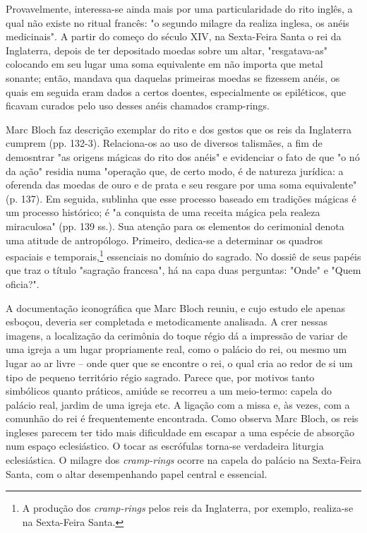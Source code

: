 \documentclass[a5paper]{book}
\begin{document}
Provavelmente, interessa-se ainda mais por uma particularidade do rito inglês, a qual não existe no ritual francês: "o segundo milagre da realiza inglesa, os anéis medicinais". A partir do começo do século XIV, na Sexta-Feira Santa o rei da Inglaterra, depois de ter depositado moedas sobre um altar, "resgatava-as" colocando em seu lugar uma soma equivalente em não importa que metal sonante; então, mandava qua daquelas primeiras moedas se fizessem anéis, os quais em seguida eram dados a certos doentes, especialmente os epiléticos, que ficavam curados pelo uso desses anéis chamados cramp-rings.

Marc Bloch faz descrição exemplar do rito e dos gestos que os reis da Inglaterra cumprem (pp. 132-3). Relaciona-os ao uso de diversos talismães, a fim de demosntrar "as origens mágicas do rito dos anéis" e evidenciar o fato de que "o nó da ação" residia numa "operação que, de certo modo, é de natureza jurídica: a oferenda das moedas de ouro e de prata e seu resgare por uma soma equivalente" (p. 137). Em seguida, sublinha que esse processo baseado em tradições mágicas é um processo histórico; é "a conquista de uma receita mágica pela realeza miraculosa" (pp. 139 ss.). Sua atenção para os elementos do cerimonial denota uma atitude de antropólogo. Primeiro, dedica-se a determinar os quadros espaciais e temporais,\footnote{A produção dos \textit{cramp-rings} pelos reis da Inglaterra, por exemplo, realiza-se na Sexta-Feira Santa.} essenciais no domínio do sagrado. No dossiê de seus papéis que traz o título "sagração francesa", há na capa duas perguntas: "Onde" e "Quem oficia?".

A documentação iconográfica que Marc Bloch reuniu, e cujo estudo ele apenas esboçou, deveria ser completada e metodicamente analisada. A crer nessas imagens, a localização da cerimônia do toque régio dá a impressão de variar de uma igreja a um lugar propriamente real, como o palácio do rei, ou mesmo um lugar ao ar livre -- onde quer que se encontre o rei, o qual cria ao redor de si um tipo de pequeno território régio sagrado. Parece que, por motivos tanto simbólicos quanto práticos, amiúde se recorreu a um meio-termo: capela do palácio real, jardim de uma igreja etc. A ligação com a missa e, às vezes, com a comunhão do rei é frequentemente encontrada. Como observa Marc Bloch, os reis ingleses parecem ter tido mais dificuldade em escapar a uma espécie de absorção num espaço eclesiástico. O tocar as escrófulas torna-se verdadeira liturgia eclesiástica. O milagre dos \textit{cramp-rings} ocorre na capela do palácio na Sexta-Feira Santa, com o altar desempenhando papel central e essencial.
\end{document}
